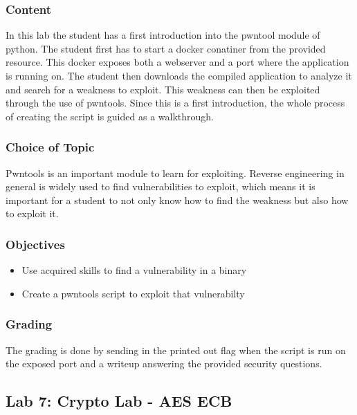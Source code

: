 \subsubsection*{Content}
In this lab the student has a first introduction into the pwntool module of python. The student first has to start a docker conatiner from the provided resource. This docker exposes both a webserver and a port where the application is running on. The student then downloads the compiled application to analyze it and search for a weakness to exploit. This weakness can then be exploited through the use of pwntools. Since this is a first introduction, the whole process of creating the script is guided as a walkthrough.
\subsubsection*{Choice of Topic}
Pwntools is an important module to learn for exploiting. Reverse engineering in general is widely used to find vulnerabilities to exploit, which means it is important for a student to not only know how to find the weakness but also how to exploit it.
\subsubsection*{Objectives}
\begin{itemize}
    \item Use acquired skills to find a vulnerability in a binary
    \item Create a pwntools script to exploit that vulnerabilty
\end{itemize}
\subsubsection*{Grading}
The grading is done by sending in the printed out flag when the script is run on the exposed port and a writeup answering the provided security questions.
\pagebreak

\subsection{Lab 7: Crypto Lab - AES ECB}
